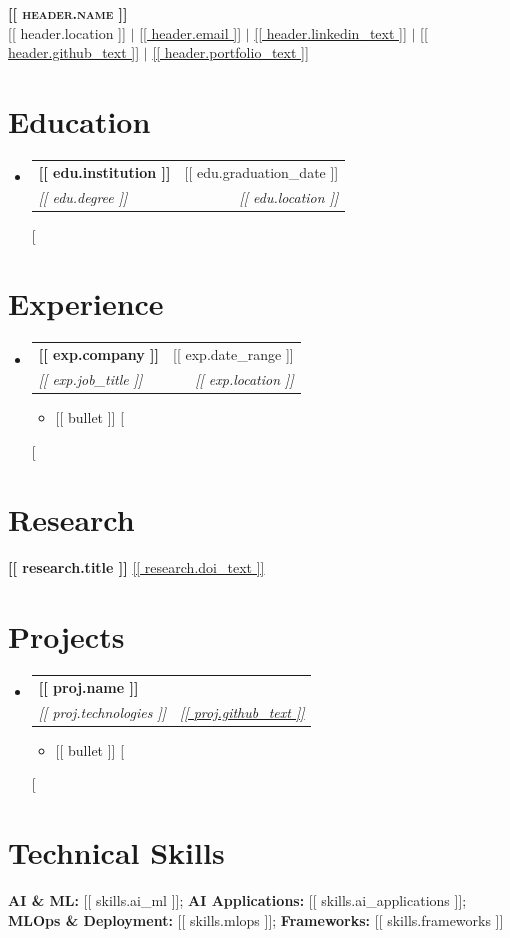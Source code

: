 \documentclass[letterpaper,11pt]{article}
\makeatletter
\newcommand{\resumeItem}[1]{\item\small{#1}}
\newcommand{\resumeSubheading}[4]{
\item
\begin{tabular*}{0.97\textwidth}{l@{\extracolsep{\fill}}r}
\textbf{#1} & #2 \\
\textit{\small #3} & \textit{\small #4}
\end{tabular*}
}
\newcommand{\resumeItemListStart}{
\begin{itemize}[leftmargin=0.15in,itemsep=1pt,topsep=2pt]
}
\newcommand{\resumeItemListEnd}{\end{itemize}}
\makeatother
\begin{document}
\begin{center}
\textbf{\Huge \scshape [[ header.name ]]}\\[-2pt]
\small [[ header.location ]] $|$
\href{mailto:[[ header.email ]]}{[[ header.email ]]} $|$
\href{[[ header.linkedin_url ]]}{[[ header.linkedin_text ]]} $|$
\href{[[ header.github_url ]]}{[[ header.github_text ]]} $|$
\href{[[ header.portfolio_url ]]}{[[ header.portfolio_text ]]}
\end{center}

\section{Education}
\begin{itemize}[leftmargin=0.15in,label={},itemsep=2pt]
[%
\resumeSubheading
{[[ edu.institution ]]}{[[ edu.graduation_date ]]}
{[[ edu.degree ]]}{[[ edu.location ]]}
[%
\end{itemize}

\section{Experience}
\begin{itemize}[leftmargin=0.15in,label={}]
[%
\resumeSubheading
{[[ exp.company ]]}{[[ exp.date_range ]]}
{[[ exp.job_title ]]}{[[ exp.location ]]}
\resumeItemListStart
[%
\resumeItem{[[ bullet ]]}
[%
\resumeItemListEnd
[%
\end{itemize}

\section{Research}
\small{
\textbf{[[ research.title ]]}
\href{[[ research.doi_url ]]}{[[ research.doi_text ]]}
}

\section{Projects}
\begin{itemize}[leftmargin=0.15in,label={}]
[%
\resumeSubheading
{[[ proj.name ]]}{}
{[[ proj.technologies ]]}{\href{[[ proj.github_url ]]}{[[ proj.github_text ]]}}
\resumeItemListStart
[%
\resumeItem{[[ bullet ]]}
[%
\resumeItemListEnd
[%
\end{itemize}

\section{Technical Skills}
\small{
\textbf{AI \& ML:} [[ skills.ai_ml ]]; 
\textbf{AI Applications:} [[ skills.ai_applications ]]; 
\textbf{MLOps \& Deployment:} [[ skills.mlops ]]; 
\textbf{Frameworks:} [[ skills.frameworks ]]
}
\end{document}
